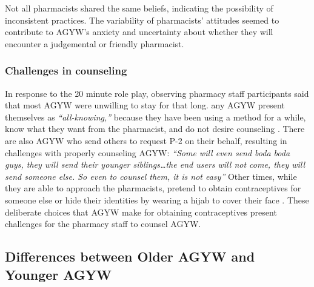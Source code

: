 Not all pharmacists shared the same beliefs, indicating the possibility of inconsistent practices. The variability of pharmacists’ attitudes seemed to contribute to AGYW’s anxiety and uncertainty about whether they will encounter a judgemental or friendly pharmacist. 

\subsubsection{Challenges in counseling}

In response to the 20 minute role play, observing pharmacy staff participants said that most AGYW were unwilling to stay for that long. any AGYW present themselves as \textit{``all-knowing,”} because they have been using a method for a while, know what they want from the pharmacist, and do not desire counseling . There are also AGYW who send others to request P-2  on their behalf, resulting in challenges with properly counseling AGYW: \textit{``Some will even send boda boda  guys, they will send their younger siblings…the end users will not come, they will send someone else. So even to counsel them, it is not easy”}  Other times, while they are able to approach the pharmacists,  pretend to obtain contraceptives for someone else or hide their identities by wearing a hijab to cover their face . These deliberate choices that AGYW make for obtaining contraceptives present challenges for the pharmacy staff to counsel AGYW. 

\subsection{Differences between Older AGYW and Younger AGYW}

